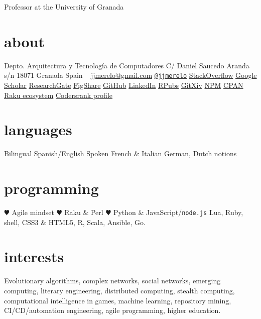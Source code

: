 \documentclass[]{friggeri-jj-cv}
\begin{document}
       {Professor at the University of Granada}

\begin{aside}
  \section{about}
    Depto. Arquitectura y Tecnología de Computadores
    C/ Daniel Saucedo Aranda s/n
    18071 Granada
    Spain
    ~
    \href{mailto:jjmerelo@gmail.com}{jjmerelo@gmail.com}
    \href{http://twitter.com/jjmerelo}{{\tt @jjmerelo}}
    \href{https://stackoverflow.com/users/891440/jjmerelo}{StackOverflow}
    \href{http://scholar.google.com/citations?user=gFxqc64AAAAJ}{Google Scholar}
    \href{https://www.researchgate.net/profile/JJ_Merelo}{ResearchGate}
    \href{https://figshare.com/authors/Juan_J_Merelo/541327}{FigShare}
   \href{https://github.com/JJ}{GitHub}
   \href{http://lnkd.in/dBVqYPa}{LinkedIn}
   \href{http://rpubs.com/jjmerelo/}{RPubs}
   \href{http://gitxiv.com/users/jj-merelo}{GitXiv}
   \href{https://www.npmjs.com/~jjmerelo}{NPM}
   \href{http://search.cpan.org/~jmerelo/}{CPAN}
   \href{https://modules.raku.org/search/?q=author%3A%22JMERELO%22}{Raku ecosystem}
   \href{https://profile.codersrank.io/user/jj}{Codersrank profile}
  \section{languages}
    Bilingual Spanish/English
    Spoken French \& Italian
    German, Dutch notions
  \section{programming}
  {\color{red} \large $\varheartsuit$} Agile mindset
  {\color{red} \large $\varheartsuit$} Raku \& Perl
  {\color{red} $\varheartsuit$} Python \& JavaScript/{\tt node.js}
    Lua, Ruby, shell, CSS3 \& HTML5, R, Scala, Ansible, Go.
  \end{aside}

\section{interests}

Evolutionary algorithms, complex networks, social networks, emerging
computing, literary engineering, distributed computing, stealth
computing, computational intelligence in games, machine learning,
repository mining, CI/CD/automation engineering, agile programming,
higher education.
\end{document}
